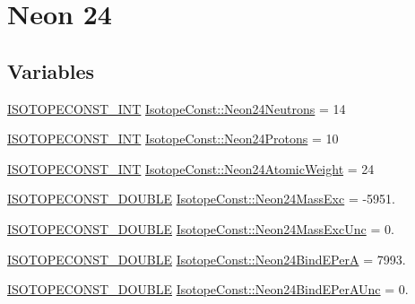 \hypertarget{group___isotope_const-_neon-_ne24}{}\section{Neon 24}
\label{group___isotope_const-_neon-_ne24}
\subsection*{Variables}
\begin{DoxyCompactItemize}
\item 
\mbox{\hyperlink{group___isotope_const-_macros_ga5f18360b3e99483a35c32d789e62621c}{I\+S\+O\+T\+O\+P\+E\+C\+O\+N\+S\+T\+\_\+\+I\+NT}} \mbox{\hyperlink{group___isotope_const-_neon-_ne24_ga00e21373d0caf452d411dfe1039107d1}{Isotope\+Const\+::\+Neon24\+Neutrons}} = 14
\item 
\mbox{\hyperlink{group___isotope_const-_macros_ga5f18360b3e99483a35c32d789e62621c}{I\+S\+O\+T\+O\+P\+E\+C\+O\+N\+S\+T\+\_\+\+I\+NT}} \mbox{\hyperlink{group___isotope_const-_neon-_ne24_gae02337c192087817e1dd2062ee1c3812}{Isotope\+Const\+::\+Neon24\+Protons}} = 10
\item 
\mbox{\hyperlink{group___isotope_const-_macros_ga5f18360b3e99483a35c32d789e62621c}{I\+S\+O\+T\+O\+P\+E\+C\+O\+N\+S\+T\+\_\+\+I\+NT}} \mbox{\hyperlink{group___isotope_const-_neon-_ne24_ga2bf57c744b2e46f2e37650d6c08f5903}{Isotope\+Const\+::\+Neon24\+Atomic\+Weight}} = 24
\item 
\mbox{\hyperlink{group___isotope_const-_macros_ga8f45a7272ce02c0b4c65c44636ed719a}{I\+S\+O\+T\+O\+P\+E\+C\+O\+N\+S\+T\+\_\+\+D\+O\+U\+B\+LE}} \mbox{\hyperlink{group___isotope_const-_neon-_ne24_ga12722f4653a5a71b533949851331f10c}{Isotope\+Const\+::\+Neon24\+Mass\+Exc}} = -\/5951.
\item 
\mbox{\hyperlink{group___isotope_const-_macros_ga8f45a7272ce02c0b4c65c44636ed719a}{I\+S\+O\+T\+O\+P\+E\+C\+O\+N\+S\+T\+\_\+\+D\+O\+U\+B\+LE}} \mbox{\hyperlink{group___isotope_const-_neon-_ne24_gabf29f5d33c7a7848d84fb861f9a607e4}{Isotope\+Const\+::\+Neon24\+Mass\+Exc\+Unc}} = 0.
\item 
\mbox{\hyperlink{group___isotope_const-_macros_ga8f45a7272ce02c0b4c65c44636ed719a}{I\+S\+O\+T\+O\+P\+E\+C\+O\+N\+S\+T\+\_\+\+D\+O\+U\+B\+LE}} \mbox{\hyperlink{group___isotope_const-_neon-_ne24_ga269da69f308017092b345b2eb7a3de54}{Isotope\+Const\+::\+Neon24\+Bind\+E\+PerA}} = 7993.
\item 
\mbox{\hyperlink{group___isotope_const-_macros_ga8f45a7272ce02c0b4c65c44636ed719a}{I\+S\+O\+T\+O\+P\+E\+C\+O\+N\+S\+T\+\_\+\+D\+O\+U\+B\+LE}} \mbox{\hyperlink{group___isotope_const-_neon-_ne24_gad3ed0fa5ae2006f4ae596cc3ad73839c}{Isotope\+Const\+::\+Neon24\+Bind\+E\+Per\+A\+Unc}} = 0.

\end{DoxyCompactItemize}
